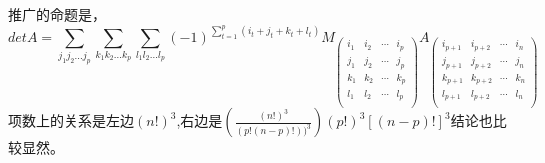 \documentclass[twoside,a4paper,CCT]{cctart}   %
\begin{document}
推广的命题是，
$$detA=\sum\limits_{j_{1}j_{2}...j_{p}} \sum\limits_{k_{1}k_{2}...k_{p}} \sum\limits_{l_{1}l_{2}...l_{p}}
(-1)^{\sum_{t=1}^{p}(i_{t}+j_{t}+k_{t}+l_{t})}
M_{\left(\begin{array}{cccc}
i_{1} & i_{2} & \cdots & i_{p} \\
j_{1} & j_{2} & \cdots & j_{p} \\
k_{1} & k_{2} & \cdots & k_{p} \\
l_{1} & l_{2} & \cdots & l_{p} \\
\end{array}\right)}
A_{\left(\begin{array}{cccc}
i_{p+1} & i_{p+2} & \cdots & i_{n} \\
j_{p+1} & j_{p+2} & \cdots & j_{n} \\
k_{p+1} & k_{p+2} & \cdots & k_{n} \\
l_{p+1} & l_{p+2} & \cdots & l_{n} \\
\end{array}\right)}$$
项数上的关系是左边$(n!)^{3}$,右边是$(\frac{(n!)^{3}}{(p!(n-p)!))^{3}})(p!)^{3}[(n-p)!]^{3}$结论也比较显然。
\end{document}
